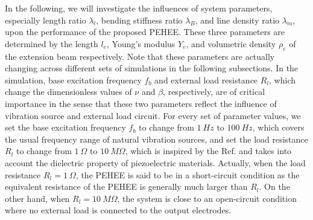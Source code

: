 \documentclass{elsarticle}
\begin{document}
In the following, we will investigate the influences of system parameters, especially length ratio $\lambda_l$, bending stiffness ratio $\lambda_B$, and line density ratio $\lambda_m$, upon the performance of the proposed PEHEE. These three parameters are determined by the length $l_e$, Young's modulus $Y_e$, and volumetric density $\rho_e$ of the extension beam respectively. Note that these parameters are actually changing across different sets of simulations in the following subsections. In the simulation, base excitation frequency $f_b$ and external load resistance $R_l$, which change the dimensionless values of $\nu$ and $\beta$, respectively, are of critical importance in the sense that these two parameters reflect the influence of vibration source and external load circuit. For every set of parameter values, we set the base excitation frequency $f_b$ to change from $1\ Hz$ to $100\ Hz$, which covers the usual frequency range of natural vibration sources, and set the load resistance $R_l$ to change from $1\ \Omega$ to $10\ M\Omega$, which is inspired by the Ref. \cite{erturk2009experimentally} and takes into account the dielectric property of piezoelectric materials. Actually, when the load resistance $R_l = 1\ \Omega$, the PEHEE is said to be in a short-circuit condition as the equivalent resistance of the PEHEE is generally much larger than $R_l$. On the other hand, when $R_l = 10\ M\Omega$, the system is close to an open-circuit condition where no external load is connected to the output electrodes.
\end{document}
